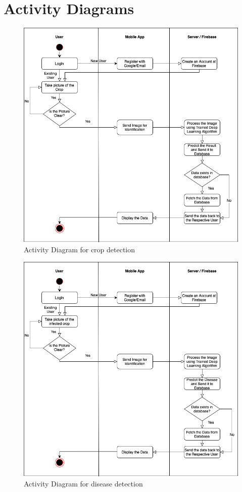 \documentclass[../Report.tex]{subfiles}
\begin{document}
\section{Activity Diagrams}
\begin{figure}[H]
    \centering
    \includegraphics[width=\linewidth]{images/activity_crop.png}
    \caption{Activity Diagram for crop detection}
    \label{fig:activity_1}
\end{figure}

\begin{figure}[H]
    \centering
    \includegraphics[width=\linewidth]{images/activity_disease.png}
    \caption{Activity Diagram for disease detection}
    \label{fig:activity_2}
\end{figure}
\end{document}
